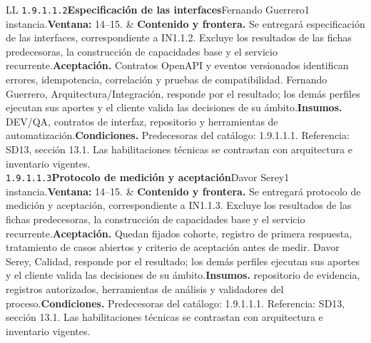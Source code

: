 \begin{longtable}{L{\tabcolsep\relax}L{\tabcolsep\relax}}
\texttt{1.\allowbreak{}9.\allowbreak{}1.\allowbreak{}1.\allowbreak{}2}\newline{}\textbf{Especificación de las interfaces}\newline{}Fernando Guerrero\newline{}1 instancia.\newline{}\textbf{Ventana:} 14--15. & \textbf{Contenido y frontera.} Se entregará especificación de las interfaces, correspondiente a IN1.1.2. Excluye los resultados de las fichas predecesoras, la construcción de capacidades base y el servicio recurrente.\newline{}\textbf{Aceptación.} Contratos OpenAPI y eventos versionados identifican errores, idempotencia, correlación y pruebas de compatibilidad. Fernando Guerrero, Arquitectura/Integración, responde por el resultado; los demás perfiles ejecutan sus aportes y el cliente valida las decisiones de su ámbito.\newline{}\textbf{Insumos.} DEV/QA, contratos de interfaz, repositorio y herramientas de automatización.\newline{}\textbf{Condiciones.} Predecesoras del catálogo: 1.9.1.1.1. Referencia: SD13, sección 13.1. Las habilitaciones técnicas se contrastan con arquitectura e inventario vigentes.\\\hline
\texttt{1.\allowbreak{}9.\allowbreak{}1.\allowbreak{}1.\allowbreak{}3}\newline{}\textbf{Protocolo de medición y aceptación}\newline{}Davor Serey\newline{}1 instancia.\newline{}\textbf{Ventana:} 14--15. & \textbf{Contenido y frontera.} Se entregará protocolo de medición y aceptación, correspondiente a IN1.1.3. Excluye los resultados de las fichas predecesoras, la construcción de capacidades base y el servicio recurrente.\newline{}\textbf{Aceptación.} Quedan fijados cohorte, registro de primera respuesta, tratamiento de casos abiertos y criterio de aceptación antes de medir. Davor Serey, Calidad, responde por el resultado; los demás perfiles ejecutan sus aportes y el cliente valida las decisiones de su ámbito.\newline{}\textbf{Insumos.} repositorio de evidencia, registros autorizados, herramientas de análisis y validadores del proceso.\newline{}\textbf{Condiciones.} Predecesoras del catálogo: 1.9.1.1.1. Referencia: SD13, sección 13.1. Las habilitaciones técnicas se contrastan con arquitectura e inventario vigentes.\\\hline

\end{longtable}
